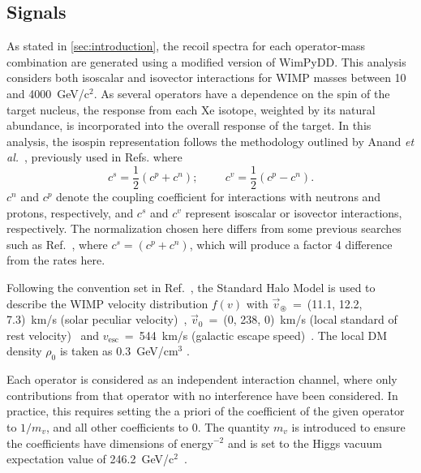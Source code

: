 \documentclass[reprint, showpacs,
preprintnumbers,
amsmath,amssymb,
aps, floatfix,
superscriptaddress,
prd, nofootinbib]{revtex4-1}
\begin{document}
\subsection{\label{subsec:signal}Signals}
\par
As stated in \autoref{sec:introduction}, the recoil spectra for each operator-mass combination are generated using a modified version of WimPyDD. 
This analysis considers both isoscalar and isovector interactions for WIMP masses between 10 and 4000~GeV/c$^2$.
As several operators have a dependence on the spin of the target nucleus, the response from each Xe isotope, weighted by its natural abundance, is incorporated into the overall response of the target.  
In this analysis, the isospin representation follows the methodology outlined by Anand \textit{et al.}~\cite{Anand:MathematicaEFT}, previously used in Refs. \cite{PandaX2:SD_EFT_2019, Xenon100:EFT_2017} where
\begin{equation}
    c^{s} = \frac{1}{2} (c^{p} + c^{n}); \hspace{1cm} c^v = \frac{1}{2}(c^p - c^n).
\end{equation}
$c^n$ and $c^p$ denote the coupling coefficient for interactions with neutrons and protons, respectively, and $c^s$ and $c^v$ represent isoscalar or isovector interactions, respectively.
The normalization chosen here differs from some previous searches such as Ref.~\cite{LUX:EFTR4_2021}, where $c^{s} = (c^p + c^n)$, which will produce a factor 4 difference from the rates here.
\par
Following the convention set in Ref.~\cite{DM_parameters:BAXTER2021_Conventions}, the Standard Halo Model is used to describe the WIMP velocity distribution $f(v)$ with $\vec{v}_\circledast$~=~(11.1, 12.2, 7.3)~km/s (solar peculiar velocity)~\cite{Schoenrich:Local_kinematics}, $\vec{v}_0$~=~(0, 238, 0)~km/s (local standard of rest velocity)~\cite{DM_parameters:galaxy_context_rest_velocity_1, DM_parameters:galaxy_context_rest_velocity_2} and $v_{\text{esc}}$~=~544~km/s (galactic escape speed)~\cite{DM_parameters:RAVE_survey_escape_velocity}. 
The local DM density $\rho_0$ is taken as 0.3~GeV/cm$^3$ \cite{DM_parameters:LEWIN199687_DM_density}. 
\par
Each operator is considered as an independent interaction channel, where only contributions from that operator with no interference have been considered. 
In practice, this requires setting the a priori of the coefficient of the given operator to $1/m_v$, and all other coefficients to 0. 
The quantity $m_v$ is introduced to ensure the coefficients have dimensions of energy$^{-2}$ and is set to the Higgs vacuum expectation value of 246.2~GeV/c$^2$~\cite{Fitzpatrick:EFT}. 
\end{document}
